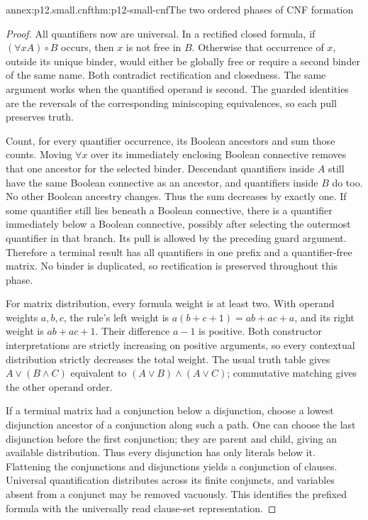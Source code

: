 \begin{annexitem}{annex:p12.small.cnf}{thm:p12-small-cnf}{The two ordered phases of CNF formation}
\begin{proof}
All quantifiers now are universal. In a rectified closed formula,
if \((\forall x A)\circ B\) occurs, then \(x\) is not free
in \(B\). Otherwise that occurrence of \(x\), outside its unique
binder, would either be globally free or require a second binder
of the same name. Both contradict rectification and closedness.
The same argument works when the quantified operand is second.
The guarded identities are the reversals of the corresponding
miniscoping equivalences, so each pull preserves truth.

Count, for every quantifier occurrence, its Boolean ancestors and
sum those counts. Moving \(\forall x\) over its immediately
enclosing Boolean connective removes that one ancestor for the
selected binder. Descendant quantifiers inside \(A\) still have
the same Boolean connective as an ancestor, and quantifiers inside
\(B\) do too. No other Boolean ancestry changes. Thus the sum
decreases by exactly one. If some quantifier still lies beneath
a Boolean connective, there is a quantifier immediately below
a Boolean connective, possibly after selecting the outermost
quantifier in that branch. Its pull is allowed by the preceding
guard argument. Therefore a terminal result has all quantifiers
in one prefix and a quantifier-free matrix. No binder is duplicated,
so rectification is preserved throughout this phase.

For matrix distribution, every formula weight is at least two.
With operand weights \(a,b,c\), the rule's left weight is
\(a(b+c+1)=ab+ac+a\), and its right weight is
\(ab+ac+1\). Their difference \(a-1\) is positive.
Both constructor interpretations are strictly increasing on
positive arguments, so every contextual distribution strictly
decreases the total weight. The usual truth table gives
\(A\lor(B\land C)\) equivalent to
\((A\lor B)\land(A\lor C)\); commutative matching gives the
other operand order.

If a terminal matrix had a conjunction below a disjunction, choose
a lowest disjunction ancestor of a conjunction along such a path.
One can choose the last disjunction before the first conjunction;
they are parent and child, giving an available distribution.
Thus every disjunction has only literals below it. Flattening
the conjunctions and disjunctions yields a conjunction of clauses.
Universal quantification distributes across its finite conjuncts,
and variables absent from a conjunct may be removed vacuously.
This identifies the prefixed formula with the universally read
clause-set representation.


\end{proof}
\end{annexitem}
